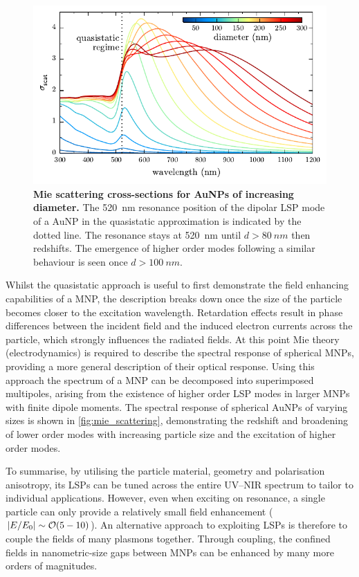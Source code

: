 \documentclass{article}
\begin{document}
\begin{figure}[bt]
\centering
\includegraphics{figures/mie_scattering}
\caption[Mie scattering cross-sections for AuNPs of increasing diameter]{\textbf{Mie scattering cross-sections for AuNPs of increasing diameter.} The \SI{520}{nm} resonance position of the dipolar LSP mode of a AuNP in the quasistatic approximation is indicated by the dotted line. The resonance stays at \SI{520}{nm} until $d>\SI{80}{nm}$ then redshifts. The emergence of higher order modes following a similar behaviour is seen once $d>\SI{100}{nm}$.}
\label{fig:mie_scattering}
\end{figure}

Whilst the quasistatic approach is useful to first demonstrate the field enhancing capabilities of a MNP, the description breaks down once the size of the particle becomes closer to the excitation wavelength. Retardation effects result in phase differences between the incident field and the induced electron currents across the particle, which strongly influences the radiated fields. At this point Mie theory (electrodynamics) \cite{mie1908} is required to describe the spectral response of spherical MNPs, providing a more general description of their optical response. Using this approach the spectrum of a MNP can be decomposed into superimposed multipoles, arising from the existence of higher order LSP modes in larger MNPs with finite dipole moments. The spectral response of spherical AuNPs of varying sizes is shown in \autoref{fig:mie_scattering}, demonstrating the redshift and broadening of lower order modes with increasing particle size and the excitation of higher order modes.

To summarise, by utilising the particle material, geometry and polarisation anisotropy, its LSPs can be tuned across the entire UV--NIR spectrum to tailor to individual applications. However, even when exciting on resonance, a single particle can only provide a relatively small field enhancement ($\left|E/E_0\right|\sim\mathcal{O}({5-10})$). An alternative approach to exploiting LSPs is therefore to couple the fields of many plasmons together. Through coupling, the confined fields in nanometric-size gaps between MNPs can be enhanced by many more orders of magnitudes.
\end{document}
